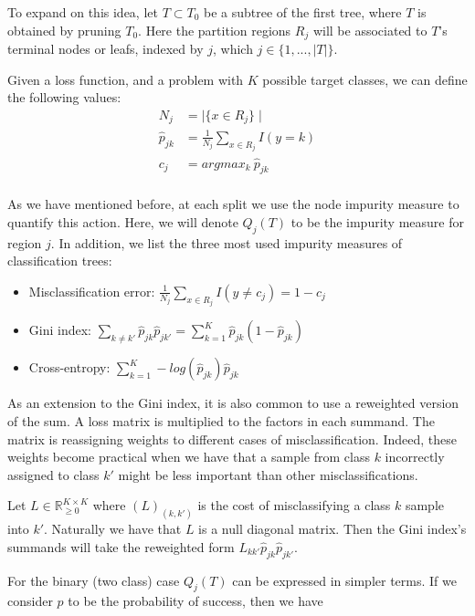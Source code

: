 To expand on this idea, let $T \subset T_0$ be a subtree of the first tree, where $T$ is obtained by pruning $T_0$.  Here the partition regions $R_j$ will be associated to $T$'s terminal nodes or leafs, indexed by $j$, which $j \in \{1,...,|T|  \}$.

Given a loss function, and a problem with $K$ possible target classes, we can define the following values:
\begin{equation}
\begin{split}
N_j & =  \mid\{x \in R_j \}\mid\\
\hat{p}_{jk} & = \frac{1}{N_j} \sum_{x \in R_j}  I(y=k)\\
c_j & =  argmax_{k} \  \hat{p}_{jk} \\
\end{split}
\end{equation}\label{decisionTreePruneParameters}

As we have mentioned before, at each split we use the node impurity measure to quantify this action. Here, we will denote $Q_j(T)$ to be the impurity measure for region $j$. In addition, we list the three most used impurity measures of classification trees:

\begin{itemize}
\item Misclassification error: $ \displaystyle \frac{1}{N_j} \sum_{x \in R_j}  I(y\neq c_j)  = 1 - c_j $
\item Gini index: $ \displaystyle \sum_{k\neq k'} \hat{p}_{jk} \hat{p}_{jk'}   = \sum_{k=1}^{K} \hat{p}_{jk} (1 - \hat{p}_{jk})  $
\item Cross-entropy: $ \displaystyle \sum_{k=1}^{K} -log(\hat{p}_{jk})\hat{p}_{jk} $
\end{itemize}


As an extension to the Gini index, it is also common to use a reweighted version of the sum. A loss matrix is multiplied to the factors in each summand. The matrix is reassigning weights to different cases of misclassification. Indeed, these weights become practical when we have that a sample from class $k$ incorrectly assigned to class $k'$ might be less important than other misclassifications.

Let $L \in \mathbb R_{\ge 0}^{K \times K}$ where $(L)_{(k,k')}$ is the cost of misclassifying a class $k$ sample into $k'$. Naturally we have that $L$ is a null diagonal matrix. Then the Gini index's summands will take the reweighted form  $L_{kk'} \hat{p}_{jk} \hat{p}_{jk'}$.

For the binary (two class) case $Q_j(T)$ can be expressed in simpler terms. If we consider $p$ to be the probability of success, then we have

